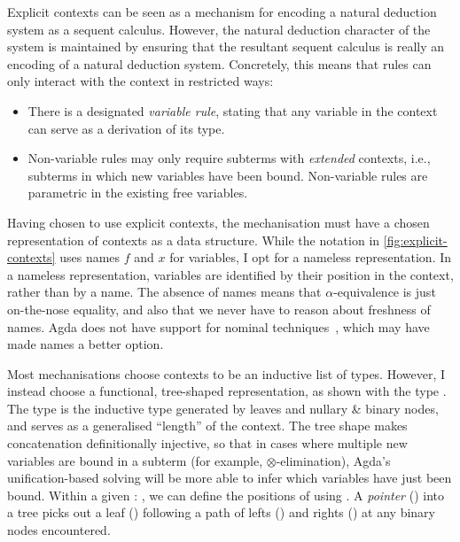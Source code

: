 Explicit contexts can be seen as a mechanism for encoding a natural deduction
system as a sequent calculus.
However, the natural deduction character of the system is maintained by
ensuring that the resultant sequent calculus is really an encoding of a
natural deduction system.
Concretely, this means that rules can only interact with the context in
restricted ways:

\begin{itemize}
  \item There is a designated \emph{variable rule}, stating that any variable
    in the context can serve as a derivation of its type.
  \item Non-variable rules may only require subterms with \emph{extended}
    contexts, i.e., subterms in which new variables have been bound.
    Non-variable rules are parametric in the existing free variables.
\end{itemize}

Having chosen to use explicit contexts, the mechanisation must have a chosen
representation of contexts as a data structure.
While the notation in \cref{fig:explicit-contexts} uses names $f$ and $x$
for variables, I opt for a nameless representation.
In a nameless representation, variables are identified by their position in
the context, rather than by a name.
The absence of names means that $\alpha$-equivalence is just on-the-nose
equality, and also that we never have to reason about freshness of names.
Agda does not have support for nominal techniques~\cite{GP02}, which may have
made names a better option.

Most mechanisations choose contexts to be an inductive list of types.
However, I instead choose a functional, tree-shaped representation, as shown
with the type .
The type  is the inductive type generated by leaves and
nullary \& binary nodes, and serves as a generalised ``length'' of the context.
The tree shape makes concatenation definitionally
injective, so that in cases where multiple new variables are bound in a subterm
(for example, $\otimes$-elimination), Agda's unification-based solving will
be more able to infer which variables have just been bound.
Within a given \AgdaSpace{}\AgdaSymbol:\AgdaSpace{}%
, we can define the positions of  using
.
A \emph{pointer} () into a tree picks out a leaf
(\AgdaInductiveConstructor{[-]}) following a path of lefts
(\AgdaInductiveConstructor{$\swarrow$}) and rights
(\AgdaInductiveConstructor{$\searrow$}) at any binary nodes encountered.

